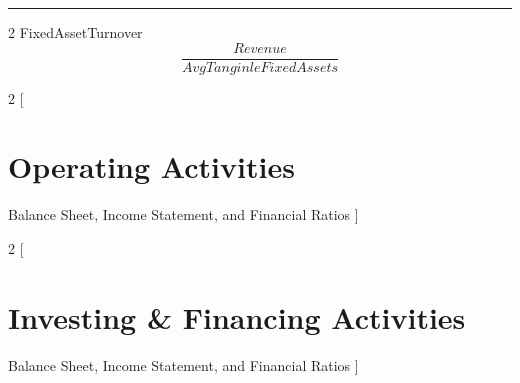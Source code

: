 \documentclass[8pt]{report}
\begin{document}
\hrule 


\begin{multicols}{2}
FixedAssetTurnover
$$
	\frac{Revenue}{Avg Tanginle Fixed Assets}
$$


\end{multicols}


\begin{multicols}{2}
[
\section{Operating Activities}
Balance Sheet, Income Statement, and Financial Ratios
]


\end{multicols}


\begin{multicols}{2}
[
\section{Investing \& Financing Activities}
Balance Sheet, Income Statement, and Financial Ratios
]


\end{multicols}
\end{document}
